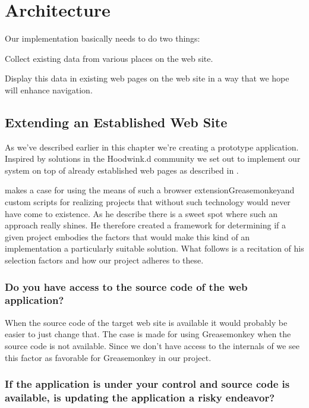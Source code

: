 \section{Architecture}
\label{section:implementation.architecture}

Our implementation basically needs to do two things:

\begin{enum}
  \item Collect existing data from various places on the \urort{} web site.
  \item Display this data in existing web pages on the \urort{} web site in
    a way that we hope will enhance navigation.
\end{enum}

\subsection{Extending an Established Web Site}

As we've described earlier in this chapter we're creating a prototype
application. Inspired by solutions in the Hoodwink.d community we set
out to implement our system on top of already established web pages as
described in .

\citet{laird07} makes a case for using the means of such a browser
extension\dash{}Greasemonkey\dash{}and custom scripts for
realizing projects that without such technology would
never have come to existence. As he describe there is a sweet spot where such
an approach really shines. He therefore created a framework for determining
if a given project embodies the factors that would make this kind of an
implementation a particularly suitable solution. What follows is a recitation
of his selection factors and how our project adheres to these.

\subsubsection{Do you have access to the source code of the web application?}

When the source code of the target web site is available it would probably
be easier to just change that. The case is made for using Greasemonkey when
the source code is not available. Since we don't have access to the internals
of \urort{} we see this factor as favorable for Greasemonkey in our project.

\subsubsection{If the application is under your control and source code is
  available, is updating the application a risky endeavor?}

